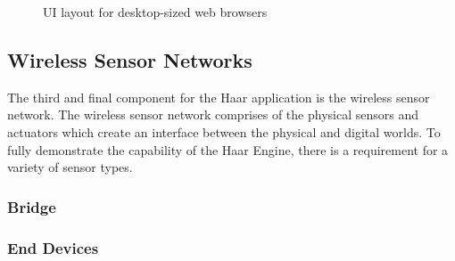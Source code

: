       \begin{figure}
        \centering
        \caption{UI layout for desktop-sized web browsers}\label{figure:desktop-layout}
      \end{figure}

    \subsection{Wireless Sensor Networks}
      The third and final component for the Haar application is the wireless sensor network. The wireless sensor network comprises of the physical sensors and actuators which create an interface between the physical and digital worlds. To fully demonstrate the capability of the Haar Engine, there is a requirement for a variety of sensor types.

      \subsubsection{Bridge}

      \subsubsection{End Devices}

